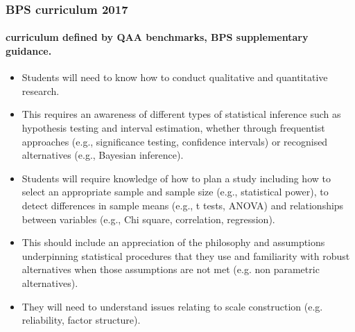 \begin{frame}
	\frametitle{BPS curriculum 2017}

	\framesubtitle{curriculum defined by QAA benchmarks, BPS supplementary guidance.}

	{\footnotesize
	\begin{itemize}
		\item Students will need to know how to conduct qualitative and quantitative research. 	
		\item This requires an awareness of different types of statistical inference such as hypothesis testing and interval estimation, whether through frequentist approaches (e.g., significance testing, confidence intervals) or recognised alternatives (e.g., Bayesian inference).
		\item Students will require knowledge of how to plan a study including how to select an appropriate sample and sample size (e.g., statistical power), to detect differences in sample means (e.g., t tests, ANOVA) and relationships between variables (e.g., Chi square, correlation, regression). 
		\item This should include an appreciation of the philosophy and assumptions underpinning statistical procedures that they use and familiarity with robust alternatives when those assumptions are not met (e.g. non parametric alternatives). 
		\item They will need to understand issues relating to scale construction (e.g. reliability, factor structure).
	\end{itemize}
	}
\end{frame}
